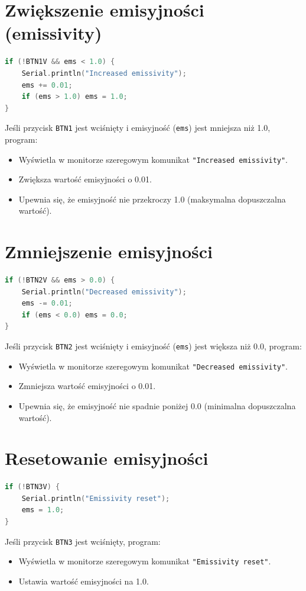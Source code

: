 \section*{Zwiększenie emisyjności (emissivity)}
\begin{lstlisting}[language=C++]
if (!BTN1V && ems < 1.0) {
    Serial.println("Increased emissivity");
    ems += 0.01;
    if (ems > 1.0) ems = 1.0;
}
\end{lstlisting}
Jeśli przycisk \texttt{BTN1} jest wciśnięty i emisyjność (\texttt{ems}) jest mniejsza niż 1.0, program:
\begin{itemize}
    \item Wyświetla w monitorze szeregowym komunikat \texttt{"Increased emissivity"}.
    \item Zwiększa wartość emisyjności o 0.01.
    \item Upewnia się, że emisyjność nie przekroczy 1.0 (maksymalna dopuszczalna wartość).
\end{itemize}

\section*{Zmniejszenie emisyjności}
\begin{lstlisting}[language=C++]
if (!BTN2V && ems > 0.0) {
    Serial.println("Decreased emissivity");
    ems -= 0.01;
    if (ems < 0.0) ems = 0.0;
}
\end{lstlisting}
Jeśli przycisk \texttt{BTN2} jest wciśnięty i emisyjność (\texttt{ems}) jest większa niż 0.0, program:
\begin{itemize}
    \item Wyświetla w monitorze szeregowym komunikat \texttt{"Decreased emissivity"}.
    \item Zmniejsza wartość emisyjności o 0.01.
    \item Upewnia się, że emisyjność nie spadnie poniżej 0.0 (minimalna dopuszczalna wartość).
\end{itemize}

\section*{Resetowanie emisyjności}
\begin{lstlisting}[language=C++]
if (!BTN3V) {
    Serial.println("Emissivity reset");
    ems = 1.0;
}
\end{lstlisting}
Jeśli przycisk \texttt{BTN3} jest wciśnięty, program:
\begin{itemize}
    \item Wyświetla w monitorze szeregowym komunikat \texttt{"Emissivity reset"}.
    \item Ustawia wartość emisyjności na 1.0.
\end{itemize}

